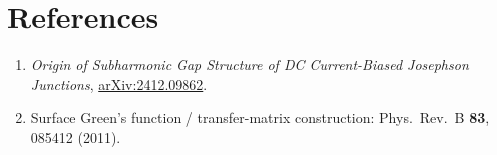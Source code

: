 \documentclass[11pt,a4paper]{article}
\begin{document}
\section*{References}
\begin{enumerate}
  \item \emph{Origin of Subharmonic Gap Structure of DC Current-Biased
        Josephson Junctions},
        \href{https://arxiv.org/abs/2412.09862}{arXiv:2412.09862}.
  \item Surface Green's function / transfer-matrix construction:
        Phys.\ Rev.\ B \textbf{83}, 085412 (2011).
\end{enumerate}
\end{document}

